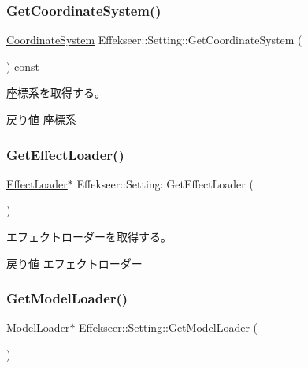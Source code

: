 \subsubsection{\texorpdfstring{Get\+Coordinate\+System()}{GetCoordinateSystem()}}
{\footnotesize\ttfamily \mbox{\hyperlink{namespace_effekseer_ac8508f8823c5fcf36aac5d2ddee23765}{Coordinate\+System}} Effekseer\+::\+Setting\+::\+Get\+Coordinate\+System (\begin{DoxyParamCaption}{ }\end{DoxyParamCaption}) const}



座標系を取得する。 

\begin{DoxyReturn}{戻り値}
座標系 
\end{DoxyReturn}
\mbox{\label{class_effekseer_1_1_setting_acc942d6e37a65418d1dd2d873fcb257d}} 
\subsubsection{\texorpdfstring{Get\+Effect\+Loader()}{GetEffectLoader()}}
{\footnotesize\ttfamily \mbox{\hyperlink{class_effekseer_1_1_effect_loader}{Effect\+Loader}}$\ast$ Effekseer\+::\+Setting\+::\+Get\+Effect\+Loader (\begin{DoxyParamCaption}{ }\end{DoxyParamCaption})}



エフェクトローダーを取得する。 

\begin{DoxyReturn}{戻り値}
エフェクトローダー 
\end{DoxyReturn}
\mbox{\label{class_effekseer_1_1_setting_a3b5645647e7fba4693f689fdae352573}} 
\subsubsection{\texorpdfstring{Get\+Model\+Loader()}{GetModelLoader()}}
{\footnotesize\ttfamily \mbox{\hyperlink{class_effekseer_1_1_model_loader}{Model\+Loader}}$\ast$ Effekseer\+::\+Setting\+::\+Get\+Model\+Loader (\begin{DoxyParamCaption}{ }\end{DoxyParamCaption})}



